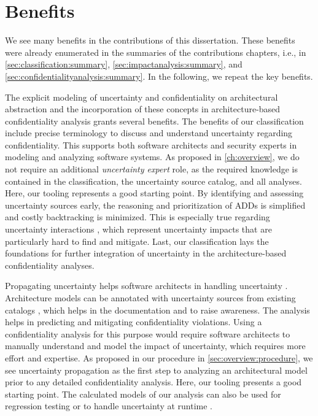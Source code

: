 \section{Benefits}%
\label{sec:conclusion:benefits}

We see many benefits in the contributions of this dissertation.
These benefits were already enumerated in the summaries of the contributions chapters, i.e., in \autoref{sec:classification:summary}, \autoref{sec:impactanalysis:summary}, and \autoref{sec:confidentialityanalysis:summary}.
In the following, we repeat the key benefits.

The explicit modeling of uncertainty and confidentiality on architectural abstraction and the incorporation of these concepts in architecture-based confidentiality analysis grants several benefits.
The benefits of our classification include precise terminology to discuss and understand uncertainty regarding confidentiality. 
This supports both software architects and security experts in modeling and analyzing software systems. 
As proposed in \autoref{ch:overview}, we do not require an additional \emph{uncertainty expert} role, as the required knowledge is contained in the classification, the uncertainty source catalog, and all analyses. 
Here, our tooling \arcen represents a good starting point.
By identifying and assessing uncertainty sources early, the reasoning and prioritization of \acfp{ADD} is simplified and costly backtracking is minimized. 
This is especially true regarding uncertainty interactions \cite{camara_addressing_2022}, which represent uncertainty impacts that are particularly hard to find and mitigate.
Last, our classification lays the foundations for further integration of uncertainty in the architecture-based confidentiality analyses.

Propagating uncertainty helps software architects in handling uncertainty \cite{acosta_uncertainty_2022}.
Architecture models can be annotated with uncertainty sources from existing catalogs \cite{hahner_arcn_2024,hahner_classification_2023}, which helps in the documentation and to raise awareness. 
The analysis helps in predicting and mitigating confidentiality violations. 
Using a confidentiality analysis for this purpose would require software architects to manually understand and model the impact of uncertainty, which requires more effort and expertise.
As proposed in our procedure in \autoref{sec:overview:procedure}, we see uncertainty propagation as the first step to analyzing an architectural model prior to any detailed confidentiality analysis.
Here, our tooling \uia presents a good starting point.
The calculated models of our analysis can also be used for regression testing or to handle uncertainty at runtime \cite{derakhshanmanesh_model-integrating_2019}.

